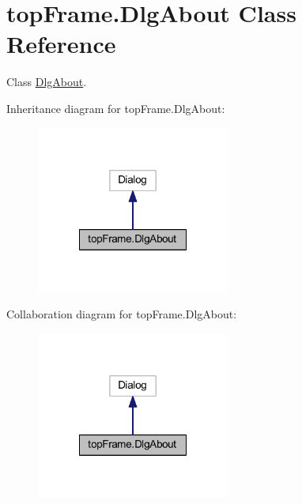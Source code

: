 \hypertarget{classtop_frame_1_1_dlg_about}{\section{top\-Frame.\-Dlg\-About Class Reference}
\label{classtop_frame_1_1_dlg_about}
}


Class \hyperlink{classtop_frame_1_1_dlg_about}{Dlg\-About}.  




Inheritance diagram for top\-Frame.\-Dlg\-About\-:
\nopagebreak
\begin{figure}[H]
\begin{center}
\leavevmode
\includegraphics[width=180pt]{classtop_frame_1_1_dlg_about__inherit__graph}
\end{center}
\end{figure}


Collaboration diagram for top\-Frame.\-Dlg\-About\-:
\nopagebreak
\begin{figure}[H]
\begin{center}
\leavevmode
\includegraphics[width=180pt]{classtop_frame_1_1_dlg_about__coll__graph}
\end{center}
\end{figure}
